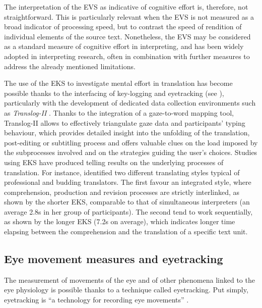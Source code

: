 The interpretation of the EVS as indicative of cognitive effort is, therefore, not straightforward. This is particularly relevant when the EVS is not measured as a broad indicator of processing speed, but to contrast the speed of rendition of individual elements of the source text. Nonetheless, the EVS may be considered as a standard measure of cognitive effort in interpreting, and has been widely adopted in interpreting research, often in combination with further measures to address the already mentioned limitations.

The use of the EKS to investigate mental effort in translation has become possible thanks to the interfacing of key-logging and eyetracking (see ), particularly with the development of dedicated data collection environments such as \textit{Translog-II} \citep{jakobsen_translog_2006}. Thanks to the integration of a gaze-to-word mapping tool, Translog-II allows to effectively triangulate gaze data and participants' typing behaviour, which provides detailed insight into the unfolding of the translation, post-editing or subtitling process and offers valuable clues on the load imposed by the subprocesses involved and on the strategies guiding the user's choices. Studies using EKS have produced telling results on the underlying processes of translation. For instance, \citet{shreve_coordination_2010} identified two different translating styles typical of professional and budding translators. The first favour an integrated style, where comprehension, production and revision processes are strictly interlinked, as shown by the shorter EKS, comparable to that of simultaneous interpreters (an average 2.8s in her group of participants). The second tend to work sequentially, as shown by the longer EKS (7.2s on average), which indicates longer time elapsing between the comprehension and the translation of a specific text unit.
\subsection{Eye movement measures and eyetracking} \label{eyemeasures}
The measurement of movements of the eye and of other phenomena linked to the eye physiology is possible thanks to a technique called eyetracking. Put simply, eyetracking is ``a technology for recording eye movements'' \citep[398]{jakobsen_translation_2020}.

